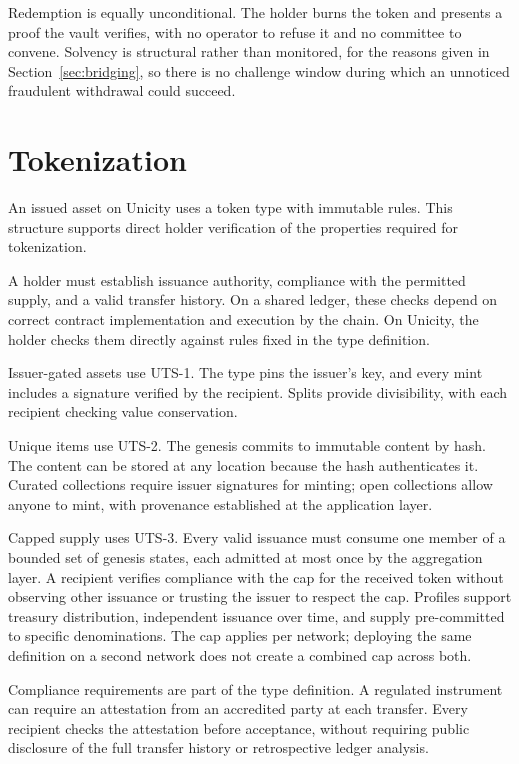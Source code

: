 Redemption is equally unconditional. The holder burns the token and presents a proof the vault verifies, with no operator to refuse it and no committee to convene. Solvency is structural rather than monitored, for the reasons given in Section~\ref{sec:bridging}, so there is no challenge window during which an unnoticed fraudulent withdrawal could succeed.

\section{Tokenization}

An issued asset on Unicity uses a token type with immutable rules. This structure supports direct holder verification of the properties required for tokenization.

A holder must establish issuance authority, compliance with the permitted supply, and a valid transfer history. On a shared ledger, these checks depend on correct contract implementation and execution by the chain. On Unicity, the holder checks them directly against rules fixed in the type definition.

Issuer-gated assets use UTS-1. The type pins the issuer's key, and every mint includes a signature verified by the recipient. Splits provide divisibility, with each recipient checking value conservation.

Unique items use UTS-2. The genesis commits to immutable content by hash. The content can be stored at any location because the hash authenticates it. Curated collections require issuer signatures for minting; open collections allow anyone to mint, with provenance established at the application layer.

Capped supply uses UTS-3. Every valid issuance must consume one member of a bounded set of genesis states, each admitted at most once by the aggregation layer. A recipient verifies compliance with the cap for the received token without observing other issuance or trusting the issuer to respect the cap. Profiles support treasury distribution, independent issuance over time, and supply pre-committed to specific denominations. The cap applies per network; deploying the same definition on a second network does not create a combined cap across both.

Compliance requirements are part of the type definition. A regulated instrument can require an attestation from an accredited party at each transfer. Every recipient checks the attestation before acceptance, without requiring public disclosure of the full transfer history or retrospective ledger analysis.


